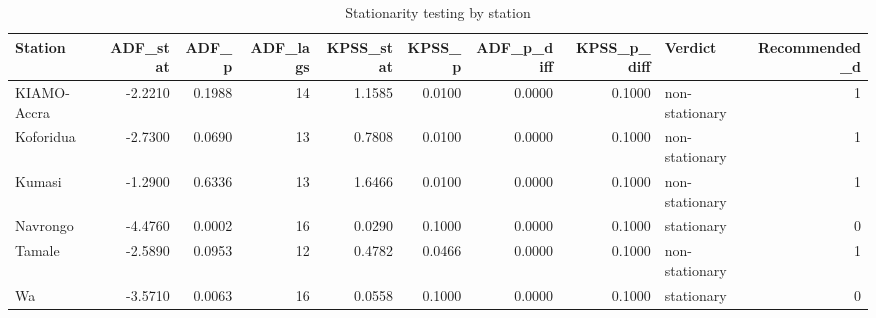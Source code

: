 \begin{table}[H]
\centering
\caption{Stationarity testing by station}
\label{tab:stationarity}
\begin{singlespace}
\begin{tabular}{lrrrrrrrlr}
\toprule
Station & ADF\_stat & ADF\_p & ADF\_lags & KPSS\_stat & KPSS\_p & ADF\_p\_diff & KPSS\_p\_diff & Verdict & Recommended\_d \\
\midrule
KIAMO-Accra & -2.2210 & 0.1988 & 14 & 1.1585 & 0.0100 & 0.0000 & 0.1000 & non-stationary & 1 \\
Koforidua & -2.7300 & 0.0690 & 13 & 0.7808 & 0.0100 & 0.0000 & 0.1000 & non-stationary & 1 \\
Kumasi & -1.2900 & 0.6336 & 13 & 1.6466 & 0.0100 & 0.0000 & 0.1000 & non-stationary & 1 \\
Navrongo & -4.4760 & 0.0002 & 16 & 0.0290 & 0.1000 & 0.0000 & 0.1000 & stationary & 0 \\
Tamale & -2.5890 & 0.0953 & 12 & 0.4782 & 0.0466 & 0.0000 & 0.1000 & non-stationary & 1 \\
Wa & -3.5710 & 0.0063 & 16 & 0.0558 & 0.1000 & 0.0000 & 0.1000 & stationary & 0 \\
\bottomrule
\end{tabular}
\end{singlespace}
\end{table}
